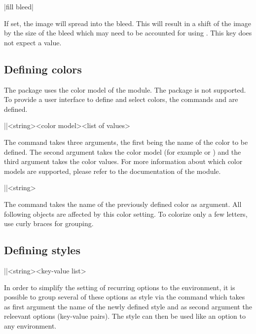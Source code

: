 \documentclass[a4paper]{article}
\begin{document}
\begin{macrodef}
|fill bleed|
\end{macrodef}
If set, the image will spread into the bleed. This will result in a shift of the image by the size of the bleed which may need to be accounted for using . This key does not expect a value.

\subsection{Defining colors}

The package uses the color model of the  module. The  package is not supported. To provide a user interface to define and select colors, the commands \macro{\leporellocolordefine} and \macro{\leporellocolorselect} are defined.

\begin{macrodef}
|\leporellocolordefine|{<string>}{<color model>}{<list of values>}
\end{macrodef}
The command \macro{\leporellocolordefine} takes three arguments, the first being the name of the color to be defined. The second argument takes the color model (for example  or ) and the third argument takes the color values. For more information about which color models are supported, please refer to the documentation of the  module.

\begin{macrodef}
|\leporellocolorselect|{<string>}
\end{macrodef}
The command \macro{\leporellocolorselect} takes the name of the previously defined color as argument. All following objects are affected by this color setting. To colorize only a few letters, use curly braces for grouping.

\subsection{Defining styles}

\begin{macrodef}
|\leporellosetstyle|{<string>}{<key-value list>}
\end{macrodef}
In order to simplify the setting of recurring options to the  environment, it is possible to group several of these options as style via the \macro{\leporellosetstyle} command which takes as first argument the name of the newly defined style and as second argument the releevant options (key-value pairs). The style can then be used like an option to any  environment.
\end{document}
